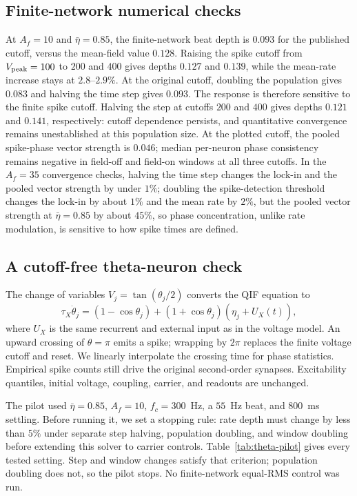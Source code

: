 \documentclass[11pt,a4paper]{article}
\newif\ifjne
\begin{document}
\subsection{Finite-network numerical checks}\label{app:qif-checks}
At $A_f=10$ and $\bar\eta=0.85$, the finite-network beat depth is $0.093$
for the published cutoff, versus the mean-field value $0.128$. Raising the spike cutoff from $V_{\rm peak}=100$ to
$200$ and $400$ gives depths $0.127$ and $0.139$, while the mean-rate increase
stays at $2.8$--$2.9\%$. At the original cutoff, doubling the population gives
$0.083$ and halving the time step gives $0.093$. The response is therefore
sensitive to the finite spike cutoff. Halving the step at cutoffs $200$ and
$400$ gives depths $0.121$ and $0.141$, respectively: cutoff dependence persists,
and quantitative convergence remains unestablished at this population size.
At the plotted cutoff, the pooled spike-phase vector strength is $0.046$;
median per-neuron phase consistency remains negative in field-off and field-on
windows at all three cutoffs.
In the $A_f=35$ convergence checks, halving the time step changes the lock-in and the pooled vector
strength by under $1\%$; doubling the spike-detection threshold changes the lock-in by
about $1\%$ and the mean rate by $2\%$, but the pooled vector strength at
$\bar\eta=0.85$ by about $45\%$, so phase concentration, unlike rate modulation, is sensitive to
how spike times are defined.


\ifjne
\subsection{A cutoff-free theta-neuron check}\label{supp:theta-pilot}
The change of variables $V_j=\tan(\theta_j/2)$ converts the QIF equation to
\[
\tau_X\dot\theta_j=(1-\cos\theta_j)
 +(1+\cos\theta_j)(\eta_j+U_X(t)),
\]
where $U_X$ is the same recurrent and external input as in the voltage model.
An upward crossing of $\theta=\pi$ emits a spike; wrapping by $2\pi$ replaces
the finite voltage cutoff and reset. We linearly interpolate the crossing
time for phase statistics. Empirical spike counts still drive the original
second-order synapses. Excitability quantiles, initial voltage, coupling,
carrier, and readouts are unchanged.

The pilot used $\bar\eta=0.85$, $A_f=10$, $f_c=300$~Hz, a $55$~Hz beat,
and $800$~ms settling. Before running it, we set a stopping rule: rate depth
must change by less than $5\%$ under separate step halving, population
doubling, and window doubling before extending this solver to carrier controls.
Table~\ref{tab:theta-pilot} gives every tested setting. Step and window changes
satisfy that criterion; population doubling does not, so the pilot stops.
No finite-network equal-RMS control was run.
\end{document}
